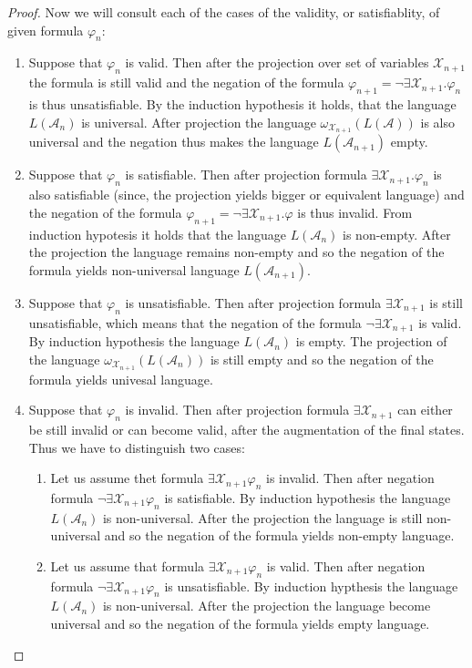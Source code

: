 \begin{proof}
 Now we will consult each of the cases of the validity, or satisfiablity, of
 given formula $\varphi_n$:
 \begin{enumerate}
   \item Suppose that $\varphi_n$ is valid. Then after the projection over set
   of variables $\mathcal{X}_{n+1}$ the formula is still valid and the negation
   of the formula $\varphi_{n+1} = \neg\exists\mathcal{X}_{n+1}.\varphi_n$ is
   thus unsatisfiable. By the induction hypothesis it holds, that the language
   $L(\mathcal{A}_n)$ is universal. After projection the language
   $\omega_{\mathcal{X}_{n+1}}(L(\mathcal{A}))$ is also universal and the
   negation thus makes the language $L(\mathcal{A}_{n+1})$ empty.
   \item Suppose that $\varphi_n$ is satisfiable. Then after projection formula
   $\exists\mathcal{X}_{n+1}. \varphi_n$ is also satisfiable (since, the
   projection yields bigger or equivalent language) and the negation of the
   formula $\varphi_{n+1} = \neg\exists\mathcal{X}_{n+1}.\varphi$ is thus
   invalid. From induction hypotesis it holds that the language
   $L(\mathcal{A}_n)$ is non-empty. After the projection the language remains
   non-empty and so the negation of the formula yields non-universal language
   $L(\mathcal{A}_{n+1})$.
   \item Suppose that $\varphi_n$ is unsatisfiable. Then after projection
   formula $\exists\mathcal{X}_{n+1}$ is still unsatisfiable, which means that
   the negation of the formula $\neg\exists\mathcal{X}_{n+1}$ is valid. By
   induction hypothesis the language $L(\mathcal{A}_n)$ is empty. The projection
   of the language $\omega_{\mathcal{X}_{n+1}}(L(\mathcal{A}_n))$ is still empty
   and so the negation of the formula yields univesal language.
   \item Suppose that $\varphi_n$ is invalid. Then after projection formula
   $\exists\mathcal{X}_{n+1}$ can either be still invalid or can become valid,
   after the augmentation of the final states. Thus we have to distinguish two
   cases:
   \begin{enumerate}
     \item Let us assume thet formula $\exists\mathcal{X}_{n+1}\varphi_n$ is
     invalid.
     Then after negation formula $\neg\exists\mathcal{X}_{n+1}\varphi_n$ is
     satisfiable. By induction hypothesis the language $L(\mathcal{A}_n)$ is
     non-universal. After the projection the language is still non-universal and
     so the negation of the formula yields non-empty language.
     \item Let us assume that formula $\exists\mathcal{X}_{n+1}\varphi_n$ is
     valid. Then after negation formula $\neg\exists\mathcal{X}_{n+1}\varphi_n$
     is unsatisfiable. By induction hypthesis the language $L(\mathcal{A}_n)$ is
     non-universal. After the projection the language become universal and so
     the negation of the formula yields empty language.
   \end{enumerate}
 \end{enumerate}
\end{proof}

